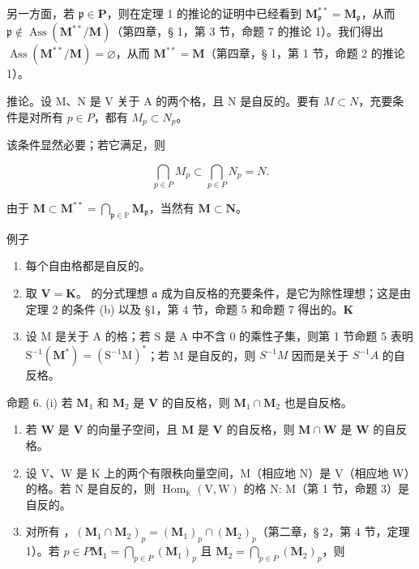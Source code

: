 另一方面，若 \(\mathfrak{p} \in \mathbf{P}\)，则在定理 1 的推论的证明中已经看到 \(\mathbf{M}_{\mathfrak{p}}^{**} = \mathbf{M}_{\mathfrak{p}}\)，从而 \(\mathfrak{p} \notin \operatorname{Ass}(\mathbf{M}^{**}/\mathbf{M})\)（第四章，§ 1，第 3 节，命题 7 的推论 1）。我们得出 \(\operatorname{Ass}(\mathbf{M}^{**}/\mathbf{M}) = \varnothing\)，从而 \(\mathbf{M}^{**} = \mathbf{M}\)（第四章，§ 1，第 1 节，命题 2 的推论 1）。

推论。设 M、N 是 V 关于 A 的两个格，且 N 是自反的。要有 \(M \subset N\)，充要条件是对所有 \(p \in P\)，都有 \(M_{p} \subset N_{p}\)。

该条件显然必要；若它满足，则

\[
\bigcap_ {p \in P} M _ {p} \subset \bigcap_ {p \in P} N _ {p} = N.
\]

由于 \(\mathbf{M} \subset \mathbf{M}^{**} = \bigcap_{\mathfrak{p} \in \mathbb{P}} \mathbf{M}_{\mathfrak{p}}\)，当然有 \(\mathbf{M} \subset \mathbf{N}\)。

例子

\begin{enumerate}
\def\labelenumi{(\arabic{enumi})}
\item
  每个自由格都是自反的。
\item
  取 \(\mathbf{V} = \mathbf{K}\)。 的分式理想 \(\mathfrak{a}\) 成为自反格的充要条件，是它为除性理想；这是由定理 2 的条件 (b) 以及 §1，第 4 节，命题 5 和命题 7 得出的。\(\mathbf{K}\)
\item
  设 M 是关于 A 的格；若 S 是 A 中不含 0 的乘性子集，则第 1 节命题 5 表明 \(\mathrm{S}^{-1}(\mathbf{M}^{*}) = (\mathrm{S}^{-1}\mathrm{M})^{*}\)；若 M 是自反的，则 \(S^{-1}M\) 因而是关于 \(S^{-1}A\) 的自反格。
\end{enumerate}

命题 6. (i) 若 \(\mathbf{M}_1\) 和 \(\mathbf{M}_2\) 是 \(\mathbf{V}\) 的自反格，则 \(\mathbf{M}_1 \cap \mathbf{M}_2\) 也是自反格。

\begin{enumerate}
\def\labelenumi{(\roman{enumi})}
\setcounter{enumi}{1}
\item
  若 \(\mathbf{W}\) 是 \(\mathbf{V}\) 的向量子空间，且 \(\mathbf{M}\) 是 \(\mathbf{V}\) 的自反格，则 \(\mathbf{M} \cap \mathbf{W}\) 是 \(\mathbf{W}\) 的自反格。
\item
  设 V、W 是 K 上的两个有限秩向量空间，M（相应地 N）是 V（相应地 W）的格。若 N 是自反的，则 \(\operatorname{Hom}_{\mathbb{K}}(\mathrm{V}, \mathrm{W})\) 的格 N: M（第 1 节，命题 3）是自反的。
\item
  对所有 ，\((\mathbf{M}_1 \cap \mathbf{M}_2)_p = (\mathbf{M}_1)_p \cap (\mathbf{M}_2)_p\)（第二章，§ 2，第 4 节，定理 1）。若 \(p \in P\)\(\mathbf{M}_1 = \bigcap_{p \in P} (\mathbf{M}_1)_p\) 且 \(\mathbf{M}_2 = \bigcap_{p \in P} (\mathbf{M}_2)_p\)，则
\end{enumerate}

